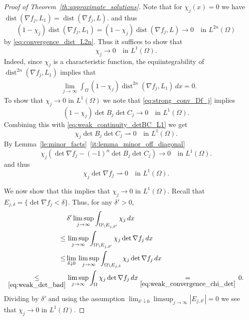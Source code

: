 \documentclass[titlepage]{amsart}
\numberwithin{equation}{section}
\theoremstyle{plain}
\theoremstyle{definition}
\theoremstyle{remark}
\newcommand{\dist}{\operatorname{dist}}
\newcommand{\g}{\nabla }
\begin{document}
\begin{proof}[Proof of Theorem~\ref{th:approximate_solutions}]
 Note that for $\chi_j(x) = 0$ we have $\dist(\g f_j, L_1) = \dist(\g f_j, L)$.
    and thus 
 \begin{equation}  \label{eq:strong_conv_Df_j}
  (1- \chi_j) \dist(\g f_j, L_1) =  (1- \chi_j) \dist(\g f_j, L)
   \to 0 \quad \text{in $L^{2n}(\Omega)$}
 \end{equation}
by   \eqref{eq:convergence_dist_L2n}.
 Thus it suffices to show that 
 \begin{equation} \label{eq:approximate_convergence_chij}
 \chi_j \to 0 \quad \text{in $L^1(\Omega)$.}
 \end{equation}
 Indeed, since $\chi_j$ is a characteristic function, the equiintegrability of $\dist^{2n}(\g f_j, L_1)$ implies that
 \begin{align*}
&  \lim_{j \to \infty}\int_{\Omega}   (1- \chi_j) \dist^{2n}(\g f_j, L_1) \, dx = 0.
 \end{align*}
To show that $\chi_j \to 0$ in $L^1(\Omega)$ 
  we note that  \eqref{eq:strong_conv_Df_j}
 implies
 \begin{equation}  \label{eq:strong_convergence_detBC}
 (1- \chi_j) \det B_j \det C_j \to 0 \quad \text{in $L^1(\Omega)$.}
 \end{equation}
 Combining this with  \eqref{eq:weak_continuity_detBC_L1} we get
  \begin{equation}  \label{eq:weak_convergence_detBC_chi}
 \chi_j \det B_j \det C_j \rightharpoonup 0 \quad \text{in $L^1(\Omega)$.}
 \end{equation}
 By Lemma~\ref{le:minor_facts}~\eqref{it:lemma_minor_off_diagonal}
 \begin{equation}  \label{eq:detF_detBC}
 \chi_j (\det \g f_j - (-1)^n \det B_j \det C_j) \to 0 \quad \text{in $L^1(\Omega)$.}
 \end{equation} and thus
 \begin{equation} \label{eq:weak_convergence_chi_det}
 \chi_j \det \g f_j \rightharpoonup 0 \quad \text{in $L^1(\Omega)$.}
 \end{equation}
 
 We now show that this implies that $\chi_j \to 0$ in $L^1(\Omega)$.
 Recall that $E_{j, \delta} = \{ \det \g f_j < \delta\}$. 
Thus, for any $\delta' > 0$, 
\begin{align*}
& \, \delta' \limsup_{j \to \infty} \int_{\Omega \setminus E_{j, \delta'}} \chi_j  \, dx \\
\le & \,   \limsup_{j \to \infty} \int_{\Omega \setminus E_{j, \delta'}} \chi_j \det \g f_j  \, dx\\
\le & \lim_{ \delta\downarrow  0} \,   \limsup_{j \to \infty} \int_{\Omega \setminus E_{j, \delta}} \chi_j \det \g f_j  \, dx\\
\underset{ \eqref{eq:weak_det_bad}}{\le} & \,   \limsup_{j \to \infty}  \int_{\Omega} \chi_j \det \g f_j  \, dx   \underset{  \eqref{eq:weak_convergence_chi_det}}{=}  \, 0.
\end{align*}
Dividing by $\delta'$ and using the assumption $\lim_{\delta' \downarrow 0} \limsup_{j \to \infty} |E_{j,\delta'}| = 0$ we see that
$\chi_j \to 0$ in $L^1(\Omega)$.


\end{proof}
\end{document}
